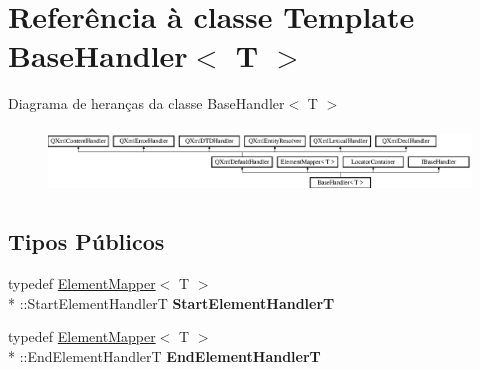 \hypertarget{class_base_handler}{\section{Referência à classe Template Base\-Handler$<$ T $>$}
\label{class_base_handler}
}
Diagrama de heranças da classe Base\-Handler$<$ T $>$\begin{figure}[H]
\begin{center}
\leavevmode
\includegraphics[height=1.726619cm]{class_base_handler}
\end{center}
\end{figure}
\subsection*{Tipos Públicos}
\begin{DoxyCompactItemize}
\item 
\hypertarget{class_base_handler_a99d76adba2066eddf6a2a09161d74dbd}{typedef \hyperlink{class_element_mapper}{Element\-Mapper}$<$ T $>$\\*
\-::Start\-Element\-Handler\-T {\bfseries Start\-Element\-Handler\-T}}\label{class_base_handler_a99d76adba2066eddf6a2a09161d74dbd}

\item 
\hypertarget{class_base_handler_addda909666f4e847e7732b0a526d0796}{typedef \hyperlink{class_element_mapper}{Element\-Mapper}$<$ T $>$\\*
\-::End\-Element\-Handler\-T {\bfseries End\-Element\-Handler\-T}}\label{class_base_handler_addda909666f4e847e7732b0a526d0796}

\end{DoxyCompactItemize}
